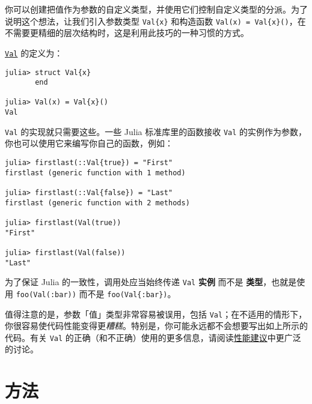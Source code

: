 你可以创建把值作为参数的自定义类型，并使用它们控制自定义类型的分派。为了说明这个想法，让我们引入参数类型 \texttt{Val\{x\}} 和构造函数 \texttt{Val(x) = Val\{x\}()}，在不需要更精细的层次结构时，这是利用此技巧的一种习惯的方式。



\hyperlink{1312938105781775871}{\texttt{Val}} 的定义为：




\begin{verbatim}
julia> struct Val{x}
       end

julia> Val(x) = Val{x}()
Val
\end{verbatim}



\texttt{Val} 的实现就只需要这些。一些 Julia 标准库里的函数接收 \texttt{Val} 的实例作为参数，你也可以使用它来编写你自己的函数，例如：




\begin{verbatim}
julia> firstlast(::Val{true}) = "First"
firstlast (generic function with 1 method)

julia> firstlast(::Val{false}) = "Last"
firstlast (generic function with 2 methods)

julia> firstlast(Val(true))
"First"

julia> firstlast(Val(false))
"Last"
\end{verbatim}



为了保证 Julia 的一致性，调用处应当始终传递 \texttt{Val} \textbf{实例} 而不是 \textbf{类型}，也就是使用 \texttt{foo(Val(:bar))} 而不是 \texttt{foo(Val\{:bar\})}。



值得注意的是，参数「值」类型非常容易被误用，包括 \texttt{Val}；在不适用的情形下，你很容易使代码性能变得更\emph{糟糕}。特别是，你可能永远都不会想要写出如上所示的代码。有关 \texttt{Val} 的正确（和不正确）使用的更多信息，请阅读\hyperlink{17259605703392147735}{性能建议}中更广泛的讨论。







\hypertarget{12379207465798704957}{}


\chapter{方法}



